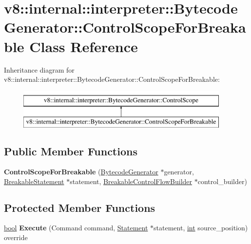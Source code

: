 \hypertarget{classv8_1_1internal_1_1interpreter_1_1BytecodeGenerator_1_1ControlScopeForBreakable}{}\section{v8\+:\+:internal\+:\+:interpreter\+:\+:Bytecode\+Generator\+:\+:Control\+Scope\+For\+Breakable Class Reference}
\label{classv8_1_1internal_1_1interpreter_1_1BytecodeGenerator_1_1ControlScopeForBreakable}
Inheritance diagram for v8\+:\+:internal\+:\+:interpreter\+:\+:Bytecode\+Generator\+:\+:Control\+Scope\+For\+Breakable\+:\begin{figure}[H]
\begin{center}
\leavevmode
\includegraphics[height=2.000000cm]{classv8_1_1internal_1_1interpreter_1_1BytecodeGenerator_1_1ControlScopeForBreakable}
\end{center}
\end{figure}
\subsection*{Public Member Functions}
\begin{DoxyCompactItemize}
\item 
\mbox{\label{classv8_1_1internal_1_1interpreter_1_1BytecodeGenerator_1_1ControlScopeForBreakable_a4f3c709adbdda63342b624f94eae12d9}} 
{\bfseries Control\+Scope\+For\+Breakable} (\mbox{\hyperlink{classv8_1_1internal_1_1interpreter_1_1BytecodeGenerator}{Bytecode\+Generator}} $\ast$generator, \mbox{\hyperlink{classv8_1_1internal_1_1BreakableStatement}{Breakable\+Statement}} $\ast$statement, \mbox{\hyperlink{classv8_1_1internal_1_1interpreter_1_1BreakableControlFlowBuilder}{Breakable\+Control\+Flow\+Builder}} $\ast$control\+\_\+builder)
\end{DoxyCompactItemize}
\subsection*{Protected Member Functions}
\begin{DoxyCompactItemize}
\item 
\mbox{\label{classv8_1_1internal_1_1interpreter_1_1BytecodeGenerator_1_1ControlScopeForBreakable_aaefb12b09598d026e9cd98c15a6bf175}} 
\mbox{\hyperlink{classbool}{bool}} {\bfseries Execute} (Command command, \mbox{\hyperlink{classv8_1_1internal_1_1Statement}{Statement}} $\ast$statement, \mbox{\hyperlink{classint}{int}} source\+\_\+position) override
\end{DoxyCompactItemize}
